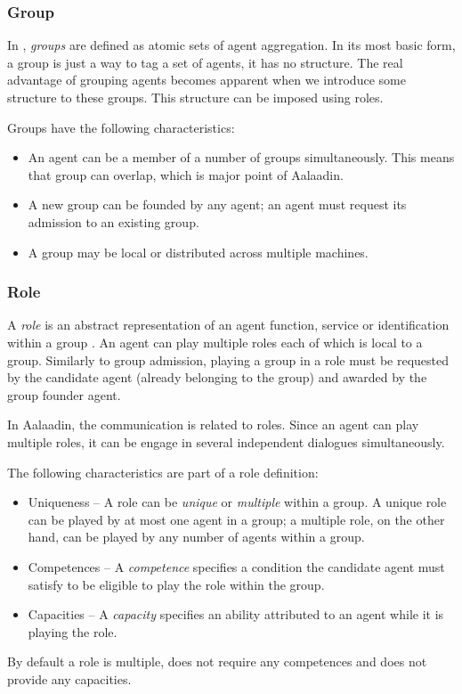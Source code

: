 \subsubsection*{Group}

In \cite{Ferber97}, \textit{groups} are defined as atomic sets of agent aggregation.
In its most basic form, a group is just a way to tag a set of agents, it has no structure.
The real advantage of grouping agents becomes apparent when we introduce some structure to these groups.
This structure can be imposed using roles.

Groups have the following characteristics:
\begin{itemize}
	\item An agent can be a member of a number of groups simultaneously.
	This means that group can overlap, which is major point of Aalaadin.
	\item A new group can be founded by any agent; an agent must request its admission to an existing group.
	\item A group may be local or distributed across multiple machines.
\end{itemize}

\subsubsection*{Role}

A \textit{role} is an abstract representation of an agent function, service or identification within a group \cite{Ferber97}.
An agent can play multiple roles each of which is local to a group.
Similarly to group admission, playing a group in a role must be requested by the candidate agent (already belonging to the group) and awarded by the group founder agent.

In Aalaadin, the communication is related to roles. Since an agent can play multiple roles, it can be engage in several independent dialogues simultaneously.

The following characteristics are part of a role definition:
\begin{itemize}
	\item Uniqueness --  A role can be \textit{unique} or \textit{multiple} within a group.
	A unique role can be played by at most one agent in a group; a multiple role, on the other hand, can be played by any number of agents within a group. 
	\item Competences -- A \textit{competence} specifies a condition the candidate agent must satisfy to be eligible to play the role within the group. 
	\item Capacities -- A \textit{capacity} specifies an ability attributed to an agent while it is playing the role.
\end{itemize}
By default a role is multiple, does not require any competences and does not provide any capacities.


